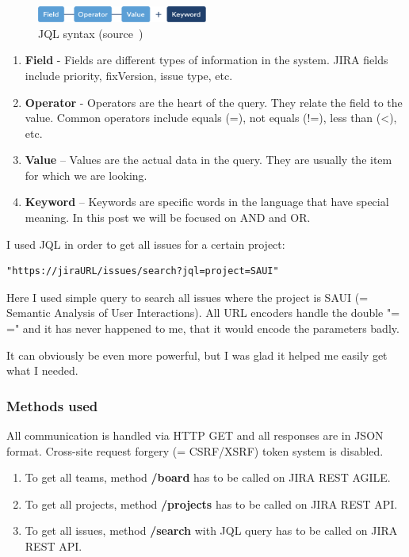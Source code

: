 \begin{figure}[!ht]
	\centering
	\includegraphics[width=0.5\textwidth]{figures/04_implementation/jql}
    \caption[JQL syntax]{JQL syntax (source~\protect\cite{jql})}
\end{figure}

\begin{enumerate}
	\item {\bf Field} - Fields are different types of information in the system. JIRA fields include priority, fixVersion, issue type, etc.
	\item {\bf Operator} - Operators are the heart of the query. They relate the field to the value. Common operators include equals (=), not equals (!=), less than (<), etc.
	\item {\bf Value} – Values are the actual data in the query. They are usually the item for which we are looking.
	\item {\bf Keyword} – Keywords are specific words in the language that have special meaning. In this post we will be focused on AND and OR.
\end{enumerate}

I used JQL in order to get all issues for a certain project:

\begin{lstlisting}
"https://jiraURL/issues/search?jql=project=SAUI"
\end{lstlisting}

Here I used simple query to search all issues where the project is SAUI (= Semantic Analysis of User Interactions). All URL encoders handle the double "= =" and it has never happened to me, that it would encode the parameters badly.

It can obviously be even more powerful, but I was glad it helped me easily get what I needed.

\subsubsection{Methods used}

All communication is handled via HTTP GET and all responses are in JSON format. Cross-site request forgery (= CSRF/XSRF) token system is disabled.

\begin{enumerate}
	\item To get all teams, method {\bf /board} has to be called on JIRA REST AGILE.
	\item To get all projects, method {\bf /projects} has to be called on JIRA REST API.
	\item To get all issues, method {\bf /search} with JQL query has to be called on JIRA REST API.
\end{enumerate}

